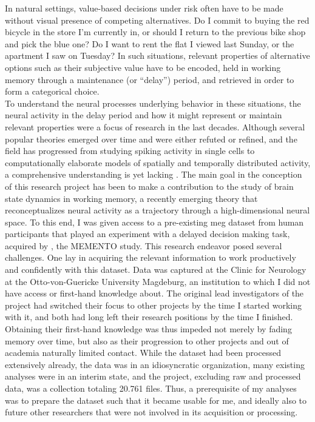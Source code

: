 In natural settings, value-based decisions under risk often have to be made without visual presence of competing alternatives.
Do I commit to buying the red bicycle in the store I'm currently in, or should I return to the previous bike shop and pick the blue one?
Do I want to rent the flat I viewed last Sunday, or the apartment I saw on Tuesday?
In such situations, relevant properties of alternative options such as their subjective value have to be encoded, held in working memory through a maintenance (or ``delay'') period, and retrieved in order to form a categorical choice.\\
To understand the neural processes underlying behavior in these situations, the neural activity in the delay period and how it might represent or maintain relevant properties were a focus of research in the last decades.
Although several popular theories emerged over time and were either refuted or refined, and the field has progressed from studying spiking activity in single cells to computationally elaborate models of spatially and temporally distributed activity, a comprehensive understanding is yet lacking \citep{sreenivasan2019and}.
The main goal in the conception of this research project has been to make a contribution to the study of brain state dynamics in working memory, a recently emerging theory that reconceptualizes neural activity as a trajectory through a high-dimensional neural space.
To this end, I was given access to a pre-existing \gls{meg} dataset from human participants that played an experiment with a delayed decision making task, acquired by \citet{kaiser}, the MEMENTO study.
This research endeavor posed several challenges.
One lay in acquiring the relevant information to work productively and confidently with this dataset.
Data was captured at the Clinic for Neurology at the Otto-von-Guericke University Magdeburg, an institution to which I did not have access or first-hand knowledge about.
The original lead investigators of the project had switched their focus to other projects by the time I started working with it, and both had long left their research positions by the time I finished.
Obtaining their first-hand knowledge was thus impeded not merely by fading memory over time, but also as their progression to other projects and out of academia naturally limited contact.
While the dataset had been processed extensively already, the data was in an idiosyncratic organization, many existing analyses were in an interim state, and the project, excluding raw and processed data, was a collection totaling 20.761 files.
Thus, a prerequisite of my analyses was to prepare the dataset such that it became usable for me, and ideally also to future other researchers that were not involved in its acquisition or processing.

